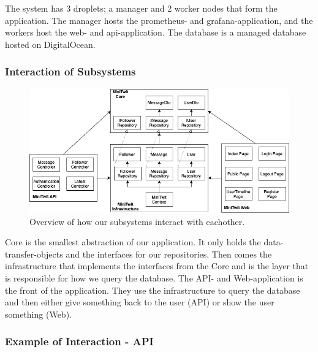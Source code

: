 The system has 3 droplets; a manager and 2 worker nodes that form the application. The manager hosts the prometheus- and grafana-application, and the workers host the web- and api-application. The database is a managed database hosted on DigitalOcean.

\subsubsection*{Interaction of Subsystems}

\begin{figure}[H]
  \centering
  \includegraphics[width=\textwidth]{Images/interaction_of_subsystems.png}
  \caption{Overview of how our subsystems interact with eachother.}
  \label{fig:interaction_of_subsystems}
\end{figure}

Core is the smallest abstraction of our application. It only holds the data-transfer-objects and the interfaces for our repositories. Then comes the infrastructure that implements the interfaces from the Core and is the layer that is responsible for how we query the database. The API- and Web-application is the front of the application. They use the infrastructure to query the database and then either give something back to the user (API) or show the user something (Web).

\subsubsection*{Example of Interaction - API}

